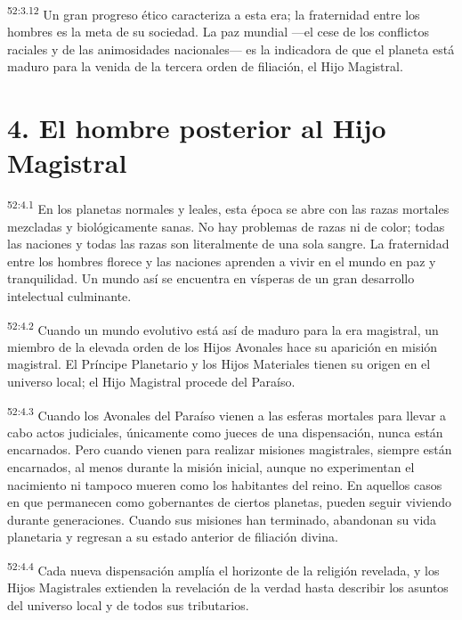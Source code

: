 \par
\textsuperscript{52:3.12} Un gran progreso ético caracteriza a esta era; la fraternidad entre los hombres es la meta de su sociedad. La paz mundial ---el cese de los conflictos raciales y de las animosidades nacionales--- es la indicadora de que el planeta está maduro para la venida de la tercera orden de filiación, el Hijo Magistral.

\section*{4. El hombre posterior al Hijo Magistral}
\par
\textsuperscript{52:4.1} En los planetas normales y leales, esta época se abre con las razas mortales mezcladas y biológicamente sanas. No hay problemas de razas ni de color; todas las naciones y todas las razas son literalmente de una sola sangre. La fraternidad entre los hombres florece y las naciones aprenden a vivir en el mundo en paz y tranquilidad. Un mundo así se encuentra en vísperas de un gran desarrollo intelectual culminante.

\par
\textsuperscript{52:4.2} Cuando un mundo evolutivo está así de maduro para la era magistral, un miembro de la elevada orden de los Hijos Avonales hace su aparición en misión magistral. El Príncipe Planetario y los Hijos Materiales tienen su origen en el universo local; el Hijo Magistral procede del Paraíso.

\par
\textsuperscript{52:4.3} Cuando los Avonales del Paraíso vienen a las esferas mortales para llevar a cabo actos judiciales, únicamente como jueces de una dispensación, nunca están encarnados. Pero cuando vienen para realizar misiones magistrales, siempre están encarnados, al menos durante la misión inicial, aunque no experimentan el nacimiento ni tampoco mueren como los habitantes del reino. En aquellos casos en que permanecen como gobernantes de ciertos planetas, pueden seguir viviendo durante generaciones. Cuando sus misiones han terminado, abandonan su vida planetaria y regresan a su estado anterior de filiación divina.

\par
\textsuperscript{52:4.4} Cada nueva dispensación amplía el horizonte de la religión revelada, y los Hijos Magistrales extienden la revelación de la verdad hasta describir los asuntos del universo local y de todos sus tributarios.

